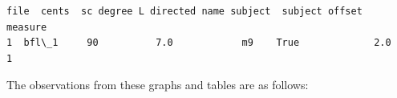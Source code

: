 \begin{Verbatim}[commandchars=\\\{\}]
    file  cents  sc degree L directed name subject  subject offset  measure
1  bfl\_1     90          7.0            m9    True             2.0        1
\end{Verbatim}


    \begin{center}
    \end{center}
    


    \begin{center}
    \end{center}
    


    \begin{center}
    \end{center}
    


    \begin{center}
    \end{center}
    
    The observations from these graphs and tables are as follows:

